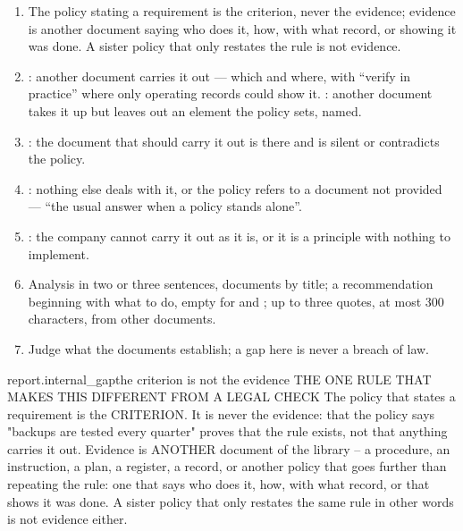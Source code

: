 \begin{enumerate}[itemsep=1pt, topsep=3pt]
  \item The policy stating a requirement is the criterion, never the evidence; evidence is
    another document saying who does it, how, with what record, or showing it was done. A
    sister policy that only restates the rule is not evidence.
  \item {}: another document carries it out --- which and where, with \enquote{verify
    in practice} where only operating records could show it. : another document
    takes it up but leaves out an element the policy sets, named.
  \item {}: the document that should carry it out is there and is silent or
    contradicts the policy.
  \item {}: nothing else deals with it, or the policy refers to a document not
    provided --- \enquote{the usual answer when a policy stands alone}.
  \item {}: the company cannot carry it out as it is, or it is a principle
    with nothing to implement.
  \item Analysis in two or three sentences, documents by title; a recommendation beginning with
    what to do, empty for  and ; up to three quotes, at most 300
    characters, from other documents.
  \item Judge what the documents establish; a gap here is never a breach of law.
\end{enumerate}

\par\nopagebreak
\begin{promptexcerpt}{report.internal_gap}{the criterion is not the evidence}
THE ONE RULE THAT MAKES THIS DIFFERENT FROM A LEGAL CHECK
The policy that states a requirement is the CRITERION. It is never the evidence: that the policy says "backups are tested every quarter" proves that the rule exists, not that anything carries it out. Evidence is ANOTHER document of the library – a procedure, an instruction, a plan, a register, a record, or another policy that goes further than repeating the rule: one that says who does it, how, with what record, or that shows it was done. A sister policy that only restates the same rule in other words is not evidence either.
\end{promptexcerpt}

